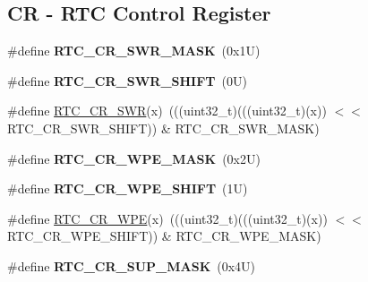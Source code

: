 \subsection*{CR -\/ R\+TC Control Register}
\begin{DoxyCompactItemize}
\item 
\mbox{\label{group___r_t_c___register___masks_ga114a670a6ac2782bd777ea33e4395059}} 
\#define {\bfseries R\+T\+C\+\_\+\+C\+R\+\_\+\+S\+W\+R\+\_\+\+M\+A\+SK}~(0x1\+U)
\item 
\mbox{\label{group___r_t_c___register___masks_gac0a88898cc6e1686b54a99e3a6fe759d}} 
\#define {\bfseries R\+T\+C\+\_\+\+C\+R\+\_\+\+S\+W\+R\+\_\+\+S\+H\+I\+FT}~(0\+U)
\item 
\#define \mbox{\hyperlink{group___r_t_c___register___masks_ga75b1e929441d00749e93c9d4b60e3740}{R\+T\+C\+\_\+\+C\+R\+\_\+\+S\+WR}}(x)~(((uint32\+\_\+t)(((uint32\+\_\+t)(x)) $<$$<$ R\+T\+C\+\_\+\+C\+R\+\_\+\+S\+W\+R\+\_\+\+S\+H\+I\+FT)) \& R\+T\+C\+\_\+\+C\+R\+\_\+\+S\+W\+R\+\_\+\+M\+A\+SK)
\item 
\mbox{\label{group___r_t_c___register___masks_gade2b0c86902f83d7674c10e3a7923f80}} 
\#define {\bfseries R\+T\+C\+\_\+\+C\+R\+\_\+\+W\+P\+E\+\_\+\+M\+A\+SK}~(0x2\+U)
\item 
\mbox{\label{group___r_t_c___register___masks_ga319f4682f30aed777eecac4c09a96223}} 
\#define {\bfseries R\+T\+C\+\_\+\+C\+R\+\_\+\+W\+P\+E\+\_\+\+S\+H\+I\+FT}~(1\+U)
\item 
\#define \mbox{\hyperlink{group___r_t_c___register___masks_gaf4b3b342ecd1384206e26ccf17dc8e3c}{R\+T\+C\+\_\+\+C\+R\+\_\+\+W\+PE}}(x)~(((uint32\+\_\+t)(((uint32\+\_\+t)(x)) $<$$<$ R\+T\+C\+\_\+\+C\+R\+\_\+\+W\+P\+E\+\_\+\+S\+H\+I\+FT)) \& R\+T\+C\+\_\+\+C\+R\+\_\+\+W\+P\+E\+\_\+\+M\+A\+SK)
\item 
\mbox{\label{group___r_t_c___register___masks_ga762afd0d0e0bbc08b631a10c45222797}} 
\#define {\bfseries R\+T\+C\+\_\+\+C\+R\+\_\+\+S\+U\+P\+\_\+\+M\+A\+SK}~(0x4\+U)
\item 
\mbox{\label{group___r_t_c___register___masks_gacf42f5f0dc8f3939de4131b7b63d0dc2}} 

\end{DoxyCompactItemize}
